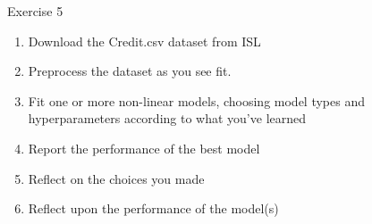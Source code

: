 \begin{frame}{Exercise 5}

\begin{enumerate}
    \item Download the Credit.csv dataset from ISL
    \item Preprocess the dataset as you see fit.
    \item Fit one or more non-linear models, choosing model types and hyperparameters according to what you've learned
    \item Report the performance of the best model
    \item Reflect on the choices you made
    \item Reflect upon the performance of the model(s)
\end{enumerate}

\end{frame}
